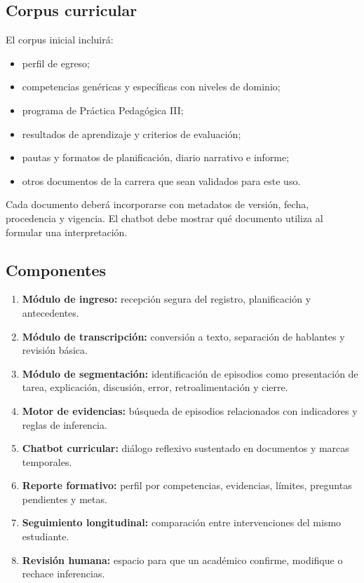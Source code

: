 \documentclass[11pt,a4paper]{article}
\begin{document}
\subsection{Corpus curricular}

El corpus inicial incluirá:

\begin{itemize}
    \item perfil de egreso;
    \item competencias genéricas y específicas con niveles de dominio;
    \item programa de Práctica Pedagógica III;
    \item resultados de aprendizaje y criterios de evaluación;
    \item pautas y formatos de planificación, diario narrativo e informe;
    \item otros documentos de la carrera que sean validados para este uso.
\end{itemize}

Cada documento deberá incorporarse con metadatos de versión, fecha, procedencia y vigencia. El chatbot debe mostrar qué documento utiliza al formular una interpretación.

\subsection{Componentes}

\begin{enumerate}
    \item \textbf{Módulo de ingreso:} recepción segura del registro, planificación y antecedentes.
    \item \textbf{Módulo de transcripción:} conversión a texto, separación de hablantes y revisión básica.
    \item \textbf{Módulo de segmentación:} identificación de episodios como presentación de tarea, explicación, discusión, error, retroalimentación y cierre.
    \item \textbf{Motor de evidencias:} búsqueda de episodios relacionados con indicadores y reglas de inferencia.
    \item \textbf{Chatbot curricular:} diálogo reflexivo sustentado en documentos y marcas temporales.
    \item \textbf{Reporte formativo:} perfil por competencias, evidencias, límites, preguntas pendientes y metas.
    \item \textbf{Seguimiento longitudinal:} comparación entre intervenciones del mismo estudiante.
    \item \textbf{Revisión humana:} espacio para que un académico confirme, modifique o rechace inferencias.
\end{enumerate}
\end{document}
